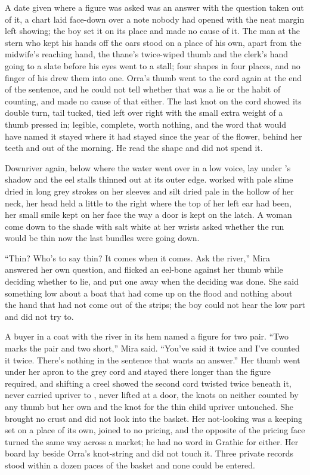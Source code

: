 A date given where a figure was asked was an answer with the question taken out of it, a chart laid face-down over a note nobody had opened with the neat margin left showing; the boy set it on its place and made no cause of it. The man at the stern who kept his hands off the oars stood on a place of his own, apart from the midwife's reaching hand, the thane's twice-wiped thumb and the clerk's hand going to a slate before his eyes went to a stall; four shapes in four places, and no finger of his drew them into one. Orra's thumb went to the cord again at the end of the sentence, and he could not tell whether that was a lie or the habit of counting, and made no cause of that either. The last knot on the cord showed its double turn, tail tucked, tied left over right with the small extra weight of a thumb pressed in; legible, complete, worth nothing, and the word that would have named it stayed where it had stayed since the year of the flower, behind her teeth and out of the morning. He read the shape and did not spend it.

\scenebreak

Downriver again, below  where the water went over in a low voice,  lay under 's shadow and the eel stalls thinned out at its outer edge.  worked with pale slime dried in long grey strokes on her sleeves and silt dried pale in the hollow of her neck, her head held a little to the right where the top of her left ear had been, her small smile kept on her face the way a door is kept on the latch. A woman come down to the shade with salt white at her wrists asked whether the run would be thin now the last bundles were going down.

“Thin? Who's to say thin? It comes when it comes. Ask the river,” Mira answered her own question, and flicked an eel-bone against her thumb while deciding whether to lie, and put one away when the deciding was done. She said something low about a boat that had come up on the flood and nothing about the hand that had not come out of the strips; the boy could not hear the low part and did not try to.

A buyer in a coat with the river in its hem named a figure for two pair. “Two marks the pair and two short,” Mira said. “You've said it twice and I've counted it twice. There's nothing in the sentence that wants an answer.” Her thumb went under her apron to the grey cord and stayed there longer than the figure required, and shifting a creel showed the second cord twisted twice beneath it, never carried upriver to , never lifted at a door, the knots on neither counted by any thumb but her own and the knot for the thin child upriver untouched. She brought no crust and did not look into the basket. Her not-looking was a keeping set on a place of its own, joined to no pricing, and the opposite of the pricing face turned the same way across a market; he had no word in Grathic for either. Her board lay beside Orra's knot-string and did not touch it. Three private records stood within a dozen paces of the basket and none could be entered.

